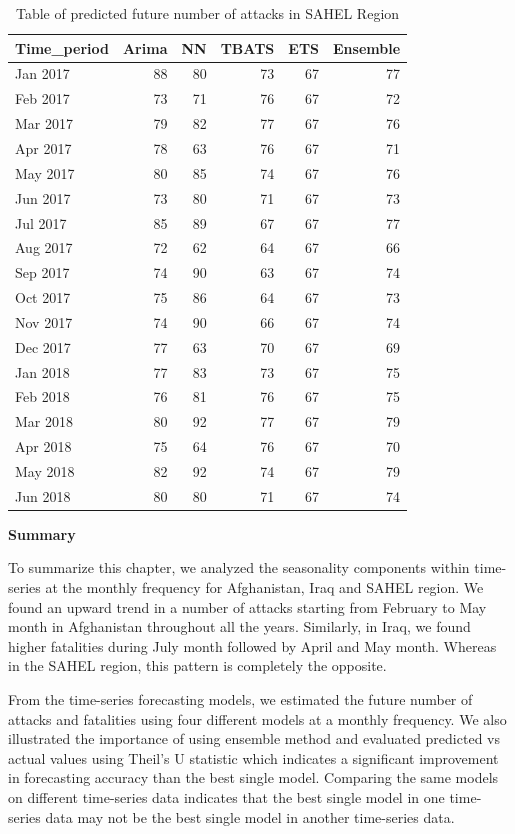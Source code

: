 \documentclass[11pt,oneside,a4paper]{reedthesis}
\begin{document}
\begin{table}[H]

\caption{\label{tab:unnamed-chunk-122}Table of predicted future number of attacks in SAHEL Region}
\centering
\fontsize{12}{14}\selectfont
\begin{tabular}[t]{lrrrrr}
\toprule
Time\_period & Arima & NN & TBATS & ETS & Ensemble\\
\midrule
Jan 2017 & 88 & 80 & 73 & 67 & 77\\
Feb 2017 & 73 & 71 & 76 & 67 & 72\\
Mar 2017 & 79 & 82 & 77 & 67 & 76\\
Apr 2017 & 78 & 63 & 76 & 67 & 71\\
May 2017 & 80 & 85 & 74 & 67 & 76\\
\addlinespace
Jun 2017 & 73 & 80 & 71 & 67 & 73\\
Jul 2017 & 85 & 89 & 67 & 67 & 77\\
Aug 2017 & 72 & 62 & 64 & 67 & 66\\
Sep 2017 & 74 & 90 & 63 & 67 & 74\\
Oct 2017 & 75 & 86 & 64 & 67 & 73\\
\addlinespace
Nov 2017 & 74 & 90 & 66 & 67 & 74\\
Dec 2017 & 77 & 63 & 70 & 67 & 69\\
Jan 2018 & 77 & 83 & 73 & 67 & 75\\
Feb 2018 & 76 & 81 & 76 & 67 & 75\\
Mar 2018 & 80 & 92 & 77 & 67 & 79\\
\addlinespace
Apr 2018 & 75 & 64 & 76 & 67 & 70\\
May 2018 & 82 & 92 & 74 & 67 & 79\\
Jun 2018 & 80 & 80 & 71 & 67 & 74\\
\bottomrule
\end{tabular}
\end{table}
\par

\textbf{Summary}

To summarize this chapter, we analyzed the seasonality components within
time-series at the monthly frequency for Afghanistan, Iraq and SAHEL
region. We found an upward trend in a number of attacks starting from
February to May month in Afghanistan throughout all the years.
Similarly, in Iraq, we found higher fatalities during July month
followed by April and May month. Whereas in the SAHEL region, this
pattern is completely the opposite.

From the time-series forecasting models, we estimated the future number
of attacks and fatalities using four different models at a monthly
frequency. We also illustrated the importance of using ensemble method
and evaluated predicted vs actual values using Theil's U statistic which
indicates a significant improvement in forecasting accuracy than the
best single model. Comparing the same models on different time-series
data indicates that the best single model in one time-series data may
not be the best single model in another time-series data.
\end{document}
